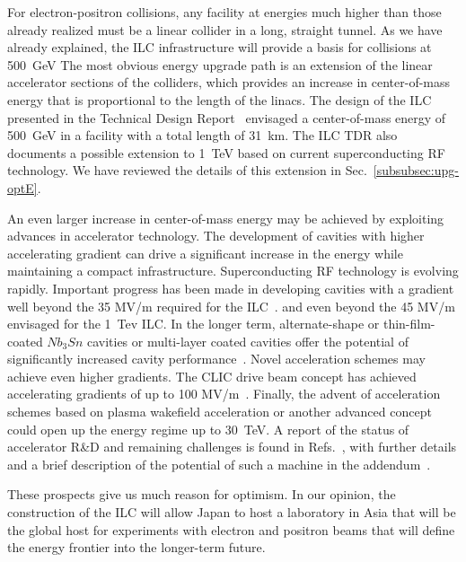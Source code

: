 For electron-positron collisions, any facility at energies much higher than
those already realized must be a linear collider in a long, straight
tunnel.
As we have already explained, 
the ILC infrastructure will provide a basis for collisions at 500~GeV
The most obvious energy upgrade path is an extension of the linear
accelerator sections of the colliders, which provides an increase
in center-of-mass energy that is proportional to the length of the linacs.
The design of the ILC presented in the Technical Design
Report~\cite{Behnke:2013xla,Adolphsen:2013jya,Adolphsen:2013kya} envisaged a
center-of-mass energy of 500~GeV{} in a facility with a total length of 31~km.
The ILC TDR also documents
a possible extension to 1~TeV based on current superconducting RF
technology.  We have reviewed the details of this extension 
 in 
Sec.~\ref{subsubsec:upg-optE}.

An even larger increase in center-of-mass energy may be achieved by
exploiting advances in accelerator technology. The development of
cavities with higher accelerating gradient can drive a significant
increase in the energy while maintaining a compact infrastructure.
Superconducting RF technology is evolving rapidly. Important
progress has been made in developing cavities with a gradient well
beyond the 35 MV/m required for 
the ILC~\cite{Grassellino:2018tqg,Grassellino:2017bod}.
and even beyond the 45 MV/m envisaged for
 the 1~Tev{} ILC.     In the longer term, alternate-shape
or thin-film-coated $Nb_3Sn$ cavities
 or multi-layer coated cavities offer the potential of
significantly increased cavity performance~\cite{Adolphsen:2013jya}.
Novel acceleration schemes may achieve even higher gradients. 
The CLIC drive beam concept has
achieved accelerating gradients of up to 100 MV/m~\cite{Aicheler:2012bya}.
Finally, the advent of acceleration schemes based on plasma
wakefield 
acceleration or another advanced concept could 
open up the energy regime up to 30~TeV. A report of the status of accelerator R\&D and remaining
challenges is found in Refs.~\cite{advancedLC2020,advancedLC}, with further details and
a brief description of the potential of such a machine in the
addendum~\cite{advancedLCaddendum}.

These prospects give us much reason for optimism. In our opinion, the
 construction
of the ILC will allow Japan to host a laboratory
in Asia that will be the global host for experiments with electron
and positron beams that will define the energy frontier into the longer-term future.



